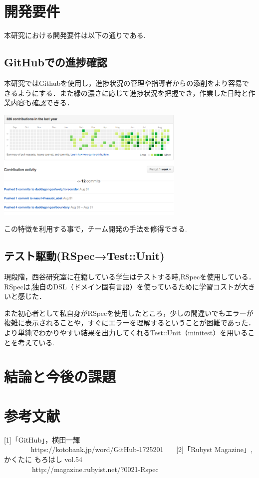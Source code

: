 \documentclass[a4j,twocolumn,uplatex]{jsarticle}
\begin{document}
\section{開発要件}
本研究における開発要件は以下の通りである.

\subsection{GitHubでの進捗確認}
本研究ではGithubを使用し，進捗状況の管理や指導者からの添削をより容易できるようにする．また緑の濃さに応じて進捗状況を把握でき，作業した日時と作業内容も確認できる．

\begin{center}
\includegraphics[width=9cm]{GitHub.jpg}
\end{center}

この特徴を利用する事で，チーム開発の手法を修得できる.\\

\subsection{テスト駆動(RSpec→Test::Unit)}
現段階，西谷研究室に在籍している学生はテストする時,RSpecを使用している．RSpecは,独自のDSL（ドメイン固有言語）を使っているために学習コストが大きいと感じた．

また初心者として私自身がRSpecを使用したところ，少しの間違いでもエラーが複雑に表示されることや，すぐにエラーを理解するということが困難であった．より単純でわかりやすい結果を出力してくれるTest::Unit（minitest）を用いることを考えている.

\section{結論と今後の課題}


\section{参考文献}
[1]「GitHub」，横田一輝\\ ~~~~~~~ https://kotobank.jp/word/GitHub-1725201
\newline ~~~[2]「Rubyst Magazine」, かくたに もろはし vol.54\\~~~~~~~~http://magazine.rubyist.net/?0021-Rspec
\end{document}
